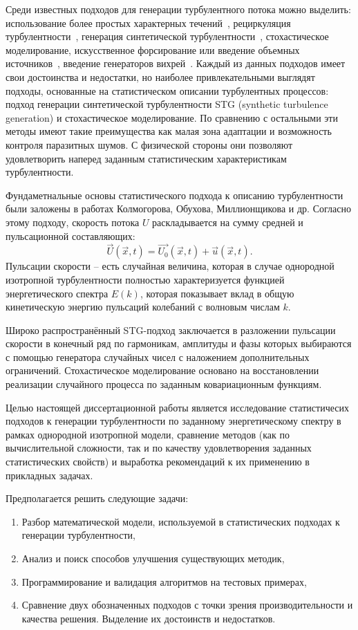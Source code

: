 Среди известных подходов для генерации турбулентного потока можно выделить:
использование более простых характерных течений~\cite{schluter2004large},
рециркуляция турбулентности~\cite{lund1998generation,spalart2006direct,shur2011rapid,araya2011dynamic},
генерация синтетической турбулентности~\cite{Kraichnan70,Smirnov2001,huang2010general,shur2014synthetic,adamian2011efficient,batten2004interfacing},
стохастическое моделирование,
искусственное форсирование или введение объемных источников~\cite{gritskevich2012embedded,spille2001generation}, введение генераторов вихрей~\cite{terracol2016investigation}.
Каждый из данных подходов имеет свои достоинства и недостатки, но наиболее привлекательными выглядят
подходы, основанные на статистическом описании турбулентных процессов:
подход генерации синтетической турбулентности STG (synthetic turbulence generation) и стохастическое моделирование.
По сравнению с остальными эти методы имеют такие преимущества как малая зона адаптации и возможность контроля паразитных шумов.
С физической стороны они позволяют удовлетворить наперед заданным статистическим характеристикам турбулентности.  

Фундаметнальные основы статистического подхода к описанию турбулентности были заложены в работах Колмогорова, Обухова, Миллионщикова и др. 
Согласно этому подходу, скорость потока $U$ раскладывается на сумму средней и пульсационной 
составляющих:
$$\vec{U}\left(\vec{x}, t\right) = \vec{U_0}\left(\vec{x}, t\right)  + \vec{u}\left(\vec{x}, t\right).$$
Пульсации скорости -- есть случайная величина, которая в случае однородной изотропной
турбулентности полностью характеризуется функцией энергетического спектра $E(k)$,
которая показывает вклад в общую кинетическую энергию пульсаций колебаний с волновым числам $k$.

Широко распространённый STG-подход заключается в разложении пульсации скорости в конечный ряд по гармоникам,
амплитуды и фазы которых выбираются с помощью генератора случайных чисел с наложением дополнительных ограничений.
Стохастическое моделирование основано на восстановлении реализации случайного процесса по заданным ковариационным функциям.

Целью настоящей диссертационной работы является исследование статистичесих подходов к генерации турбулентности
по заданному энергетическому спектру в рамках однородной изотропной модели,
сравнение методов (как по вычислительной сложности, так и по качеству удовлетворения заданных статистических свойств) и 
выработка рекомендаций к их применению в прикладных задачах.

Предполагается решить следующие задачи:
\begin{enumerate}
	\item Разбор математической модели, используемой в статистических подходах к генерации турбулентности,
	\item Анализ и поиск способов улучшения существующих методик,
	\item Программирование и валидация алгоритмов на тестовых примерах,
	\item Сравнение двух обозначенных подходов с точки зрения производительности и качества решения. Выделение их достоинств и недостатков.
\end{enumerate}
